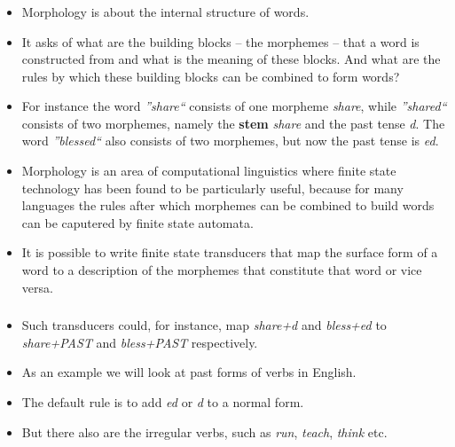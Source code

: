 \begin{frame}

	\frametitle{\insertsection}
	\framesubtitle{\insertsubsection}
	
	\begin{itemize}
		\item Morphology is about the internal structure of words.
		\item It asks of what are the building blocks -- the morphemes -- that a word is constructed from and what is the meaning of these blocks.
		 And what are the rules by which these building blocks can be combined to form words?
		\item For instance the word \textit{''share``} consists of one morpheme \textit{share}, while \textit{''shared``} consists of two morphemes, namely
		the \textbf{stem} \textit{share} and the past tense \textit{d}. The word \textit{''blessed``} also consists of two morphemes, but now the past tense
		is \textit{ed}.
		\item Morphology is an area of computational linguistics where finite state technology has been found to be particularly useful, because for many languages the rules after which morphemes can be combined to build words can be caputered by finite state automata.
		\item It is possible to write finite state transducers that map the surface form of a word to a description of the morphemes that constitute that word or vice versa.
	\end{itemize}
	

\end{frame}



\begin{frame}

	\frametitle{\insertsection}
	\framesubtitle{\insertsubsection}
	
	\begin{itemize}
		\item Such transducers could, for instance, map \textit{share+d} and \textit{bless+ed} to \textit{share+PAST} and \textit{bless+PAST} respectively.
		\item As an example we will look at past forms of verbs in English.
		\item The default rule is to add \textit{ed} or \textit{d} to a normal form.
		\item But there also are the irregular verbs, such as \textit{run}, \textit{teach}, \textit{think} etc.
	\end{itemize}

\end{frame}


